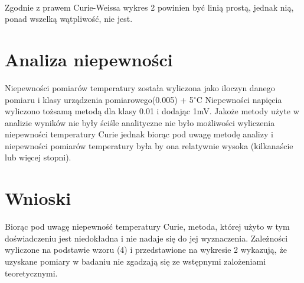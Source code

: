 \documentclass[a4paper,10pt]{article}
\begin{document}
Zgodnie z prawem Curie-Weissa wykres 2 powinien być linią prostą, jednak nią, ponad wszelką wątpliwość, nie jest.

\section{Analiza niepewności}

Niepewności pomiarów temperatury została wyliczona jako iloczyn danego pomiaru i klasy urządzenia pomiarowego(0.005) + 5$^\circ$C
Niepewności napięcia wyliczono tożsamą metodą dla klasy 0.01 i dodając 1mV.
Jakoże metody użyte w analizie wyników nie były ściśle analityczne nie było możliwości wyliczenia niepewności temperatury Curie jednak
biorąc pod uwagę metodę analizy i niepewności pomiarów temperatury była by ona relatywnie wysoka (kilkanaście lub więcej stopni).

\section{Wnioski}
Biorąc pod uwagę niepewność temperatury Curie, metoda, której użyto w tym doświadczeniu jest niedokładna i  nie nadaje się do jej wyznaczenia.
Zależności wyliczone na podstawie wzoru (4) i przedstawione na wykresie 2 wykazują, że uzyskane pomiary w badaniu nie zgadzają się ze wstępnymi zalożeniami teoretycznymi.
\end{document}
